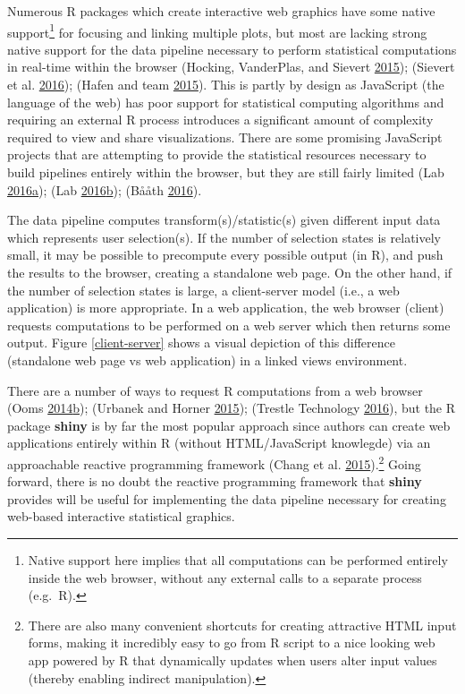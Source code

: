 \documentclass[12pt,]{isuthesis}
\let\rmarkdownfootnote\footnote%
\def\footnote{\protect\rmarkdownfootnote}
\begin{document}
Numerous R packages which create interactive web graphics have some
native support\footnote{Native support here implies that all
  computations can be performed entirely inside the web browser, without
  any external calls to a separate process (e.g.~R).} for focusing and
linking multiple plots, but most are lacking strong native support for
the data pipeline necessary to perform statistical computations in
real-time within the browser (Hocking, VanderPlas, and Sievert
\protect\hyperlink{ref-animint}{2015}); (Sievert et al.
\protect\hyperlink{ref-plotly}{2016}); (Hafen and team
\protect\hyperlink{ref-rbokeh}{2015}). This is partly by design as
JavaScript (the language of the web) has poor support for statistical
computing algorithms and requiring an external R process introduces a
significant amount of complexity required to view and share
visualizations. There are some promising JavaScript projects that are
attempting to provide the statistical resources necessary to build
pipelines entirely within the browser, but they are still fairly limited
(Lab
\protect\hyperlink{ref-datalib}{2016}\protect\hyperlink{ref-datalib}{a});
(Lab
\protect\hyperlink{ref-vega-dataflow}{2016}\protect\hyperlink{ref-vega-dataflow}{b});
(Bååth \protect\hyperlink{ref-bayes-js}{2016}).

The data pipeline computes transform(s)/statistic(s) given different
input data which represents user selection(s). If the number of
selection states is relatively small, it may be possible to precompute
every possible output (in R), and push the results to the browser,
creating a standalone web page. On the other hand, if the number of
selection states is large, a client-server model (i.e., a web
application) is more appropriate. In a web application, the web browser
(client) requests computations to be performed on a web server which
then returns some output. Figure \ref{client-server} shows a visual
depiction of this difference (standalone web page vs web application) in
a linked views environment.

There are a number of ways to request R computations from a web browser
(Ooms
\protect\hyperlink{ref-opencpu}{2014}\protect\hyperlink{ref-opencpu}{b});
(Urbanek and Horner \protect\hyperlink{ref-FastRWeb}{2015}); (Trestle
Technology \protect\hyperlink{ref-plumber}{2016}), but the R package
\textbf{shiny} is by far the most popular approach since authors can
create web applications entirely within R (without HTML/JavaScript
knowlegde) via an approachable reactive programming framework (Chang et
al. \protect\hyperlink{ref-shiny}{2015}).\footnote{There are also many
  convenient shortcuts for creating attractive HTML input forms, making
  it incredibly easy to go from R script to a nice looking web app
  powered by R that dynamically updates when users alter input values
  (thereby enabling indirect manipulation).} Going forward, there is no
doubt the reactive programming framework that \textbf{shiny} provides
will be useful for implementing the data pipeline necessary for creating
web-based interactive statistical graphics.
\end{document}
